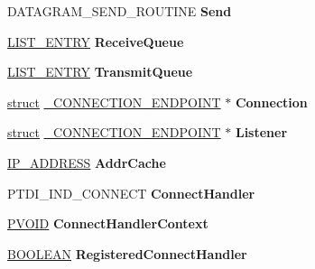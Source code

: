 \begin{DoxyCompactItemize}
D\+A\+T\+A\+G\+R\+A\+M\+\_\+\+S\+E\+N\+D\+\_\+\+R\+O\+U\+T\+I\+NE {\bfseries Send}
\item 
\mbox{\label{struct___a_d_d_r_e_s_s___f_i_l_e_a25153ff7485d4c658e809cbaa2d3fd93}} 
\hyperlink{struct___l_i_s_t___e_n_t_r_y}{L\+I\+S\+T\+\_\+\+E\+N\+T\+RY} {\bfseries Receive\+Queue}
\item 
\mbox{\label{struct___a_d_d_r_e_s_s___f_i_l_e_a8c72f12292c0e46e7632d934956204c0}} 
\hyperlink{struct___l_i_s_t___e_n_t_r_y}{L\+I\+S\+T\+\_\+\+E\+N\+T\+RY} {\bfseries Transmit\+Queue}
\item 
\mbox{\label{struct___a_d_d_r_e_s_s___f_i_l_e_a04821e4ba10b95536e7d20fcea4e5f1c}} 
\hyperlink{interfacestruct}{struct} \hyperlink{struct___c_o_n_n_e_c_t_i_o_n___e_n_d_p_o_i_n_t}{\+\_\+\+C\+O\+N\+N\+E\+C\+T\+I\+O\+N\+\_\+\+E\+N\+D\+P\+O\+I\+NT} $\ast$ {\bfseries Connection}
\item 
\mbox{\label{struct___a_d_d_r_e_s_s___f_i_l_e_ad5c65153c09391939f373a33c31282b2}} 
\hyperlink{interfacestruct}{struct} \hyperlink{struct___c_o_n_n_e_c_t_i_o_n___e_n_d_p_o_i_n_t}{\+\_\+\+C\+O\+N\+N\+E\+C\+T\+I\+O\+N\+\_\+\+E\+N\+D\+P\+O\+I\+NT} $\ast$ {\bfseries Listener}
\item 
\mbox{\label{struct___a_d_d_r_e_s_s___f_i_l_e_a72bf4d631c6f5dae1eab71b96c916541}} 
\hyperlink{struct_i_p___a_d_d_r_e_s_s}{I\+P\+\_\+\+A\+D\+D\+R\+E\+SS} {\bfseries Addr\+Cache}
\item 
\mbox{\label{struct___a_d_d_r_e_s_s___f_i_l_e_a654852ff81c862135c38a10f5df569e1}} 
P\+T\+D\+I\+\_\+\+I\+N\+D\+\_\+\+C\+O\+N\+N\+E\+CT {\bfseries Connect\+Handler}
\item 
\mbox{\label{struct___a_d_d_r_e_s_s___f_i_l_e_a3b8a0ee7b879ef5a7134c48627cc6fa2}} 
\hyperlink{interfacevoid}{P\+V\+O\+ID} {\bfseries Connect\+Handler\+Context}
\item 
\mbox{\label{struct___a_d_d_r_e_s_s___f_i_l_e_a06e47e026f908ba35858de7e5471caf0}} 
\hyperlink{_processor_bind_8h_a112e3146cb38b6ee95e64d85842e380a}{B\+O\+O\+L\+E\+AN} {\bfseries Registered\+Connect\+Handler}

\end{DoxyCompactItemize}
